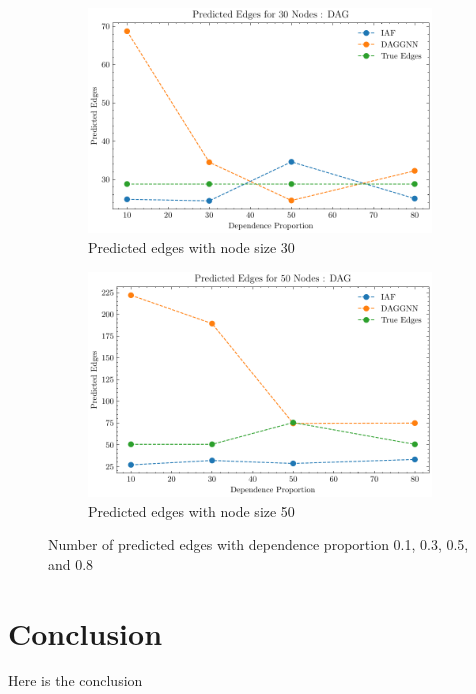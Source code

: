 \documentclass[10pt]{article}
\begin{document}
\begin{figure}[H]
\begin{subfigure}{0.45\textwidth}
        \includegraphics[width=\textwidth]{fig/Predicted Edges_dependence_30_DAG_threshold0.3.pdf}
        \caption{Predicted edges with node size 30}
        \label{pred_edge_node30}
    \end{subfigure}
    \hfill
    \begin{subfigure}{0.45\textwidth}
        \includegraphics[width=\textwidth]{fig/Predicted Edges_dependence_50_DAG_threshold0.3.pdf}
        \caption{Predicted edges with node size 50}
        \label{pred_edge_node50}
    \end{subfigure}
    \caption{Number of predicted edges with dependence proportion 0.1, 0.3, 0.5, and 0.8}
    \label{pred_edge}
\end{figure}


\section{Conclusion}

Here is the conclusion



\end{document}
